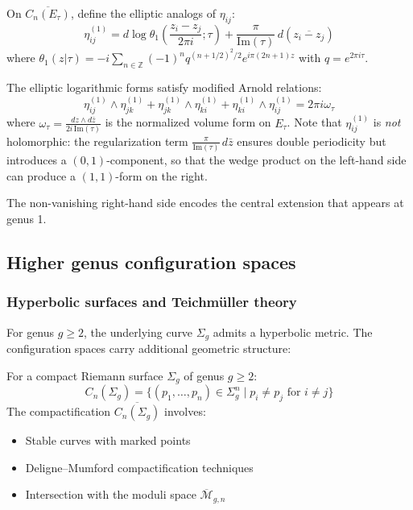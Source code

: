 \begin{definition}
On $\overline{C_n(E_\tau)}$, define the elliptic analogs of $\eta_{ij}$:
\[
\eta_{ij}^{(1)} = d\log\theta_1\left(\frac{z_i - z_j}{2\pi i}; \tau\right) + \frac{\pi}{\mathrm{Im}(\tau)}\, d(\overline{z_i - z_j})
\]
where $\theta_1(z|\tau) = -i\sum_{n \in \mathbb{Z}}(-1)^n q^{(n+1/2)^2/2}e^{i\pi(2n+1)z}$ with $q = e^{2\pi i\tau}$.
\end{definition}

\begin{proposition}
\label{prop:elliptic-arnold-relations}
The elliptic logarithmic forms satisfy modified Arnold relations:
\[
\eta_{ij}^{(1)} \wedge \eta_{jk}^{(1)} + \eta_{jk}^{(1)} \wedge \eta_{ki}^{(1)} + \eta_{ki}^{(1)} \wedge \eta_{ij}^{(1)} = 2\pi i \omega_\tau
\]
where $\omega_\tau = \frac{dz \wedge d\bar{z}}{2i\,\mathrm{Im}(\tau)}$ is the normalized volume form on $E_\tau$. Note that $\eta_{ij}^{(1)}$ is \emph{not} holomorphic: the regularization term $\frac{\pi}{\mathrm{Im}(\tau)}\,d\bar{z}$ ensures double periodicity but introduces a $(0,1)$-component, so that the wedge product on the left-hand side can produce a $(1,1)$-form on the right.
\end{proposition}

The non-vanishing right-hand side encodes the central extension that appears at genus 1.

\subsection{Higher genus configuration spaces}

\subsubsection{Hyperbolic surfaces and Teichmüller theory}

For genus $g \geq 2$, the underlying curve $\Sigma_g$ admits a hyperbolic metric. The configuration spaces carry additional geometric structure:

\begin{definition}
For a compact Riemann surface $\Sigma_g$ of genus $g \geq 2$:
\[
C_n(\Sigma_g) = \{(p_1, \ldots, p_n) \in \Sigma_g^n \mid p_i \neq p_j \text{ for } i \neq j\}
\]
The compactification $\overline{C_n(\Sigma_g)}$ involves:
\begin{itemize}
\item Stable curves with marked points
\item Deligne--Mumford compactification techniques
\item Intersection with the moduli space $\overline{\mathcal{M}}_{g,n}$
\end{itemize}
\end{definition}

